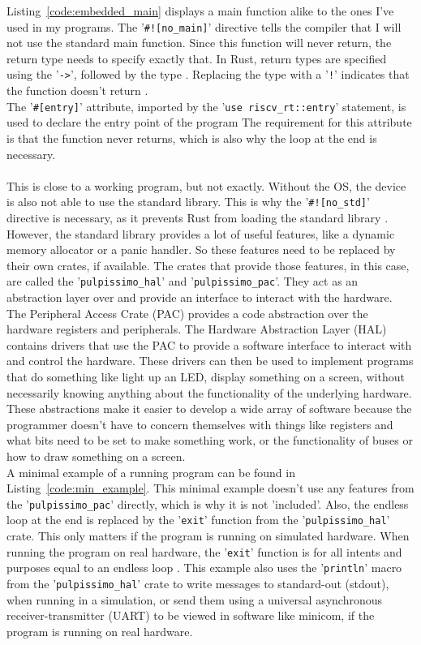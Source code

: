 Listing~\ref{code:embedded_main} displays a main function alike to the ones I've used in my programs.
The '\lstinline{#![no_main]}' directive tells the compiler that I will not use the standard main function.
Since this function will never return, the return type needs to specify exactly that.
In Rust, return types are specified using the '\lstinline{->}', followed by the type \cite{rust_return}.
Replacing the type with a '\lstinline{!}' indicates that the function doesn't return \cite{rust_never_type}.
\\
The '\lstinline{#[entry]}' attribute, imported by the '\lstinline{use riscv_rt::entry}' statement, is used to declare the entry point of the program \cite{riscv_rt_entry}
The requirement for this attribute is that the function never returns, which is also why the loop at the end is necessary.
\\\\
This is close to a working program, but not exactly.
Without the OS, the device is also not able to use the standard library.
This is why the '\lstinline{#![no_std]}' directive is necessary, as it prevents Rust from loading the standard library \cite{rust_no_std}.
However, the standard library provides a lot of useful features, like a dynamic memory allocator or a panic handler.
So these features need to be replaced by their own crates, if available.
The crates that provide those features, in this case, are called the '\lstinline{pulpissimo_hal}' and '\lstinline{pulpissimo_pac}'.
They act as an abstraction layer over and provide an interface to interact with the hardware.
The Peripheral Access Crate (PAC) provides a code abstraction over the hardware registers and peripherals.
The Hardware Abstraction Layer (HAL) contains drivers that use the PAC to provide a software interface
to interact with and control the hardware.
These drivers can then be used to implement programs that do something like light up an LED, display something on a screen,
without necessarily knowing anything about the functionality of the underlying hardware.
These abstractions make it easier to develop a wide array of software because the programmer doesn't have to concern themselves
with things like registers and what bits need to be set to make something work, or the functionality of buses or how to draw
something on a screen.
\\
A minimal example of a running program can be found in Listing~\ref{code:min_example}.
This minimal example doesn't use any features from the '\lstinline{pulpissimo_pac}' directly, which is why it is not 'included'.
Also, the endless loop at the end is replaced by the '\lstinline{exit}' function from the '\lstinline{pulpissimo_hal}' crate.
This only matters if the program is running on simulated hardware. When running the program on real hardware, the '\lstinline{exit}' function is
for all intents and purposes equal to an endless loop \cite[Ch 4.3.10]{rust_pulp}.
This example also uses the '\lstinline{println}' macro from the '\lstinline{pulpissimo_hal}' crate to write messages
to standard-out (stdout), when running in a simulation, or send them using a universal asynchronous receiver-transmitter (UART)
to be viewed in software like minicom, if the program is running on real hardware.

